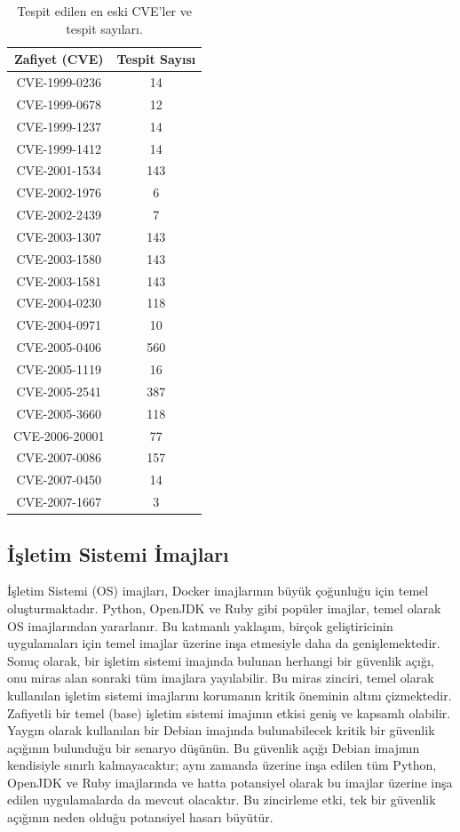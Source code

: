 \begin{table}
    \centering
    \begin{tabular}{ |c|c| }
        \hline
        Zafiyet (CVE) & Tespit Sayısı \\
        \hline
        CVE-1999{-}0236  & 14 \\
        CVE-1999{-}0678  & 12 \\
        CVE-1999{-}1237  & 14 \\
        CVE-1999{-}1412  & 14 \\
        CVE-2001{-}1534  & 143 \\
        CVE-2002{-}1976  & 6 \\
        CVE-2002{-}2439  & 7 \\
        CVE-2003{-}1307  & 143 \\
        CVE-2003{-}1580  & 143 \\
        CVE-2003{-}1581  & 143 \\
        CVE-2004{-}0230  & 118 \\
        CVE-2004{-}0971  & 10 \\
        CVE-2005{-}0406  & 560 \\
        CVE-2005{-}1119  & 16 \\
        CVE-2005{-}2541  & 387 \\
        CVE-2005{-}3660  & 118 \\
        CVE-2006{-}20001 & 77 \\
        CVE-2007{-}0086  & 157 \\
        CVE-2007{-}0450  & 14 \\
        CVE-2007{-}1667  & 3 \\
        \hline
    \end{tabular}
    \caption{Tespit edilen en eski CVE'ler ve tespit sayıları.}\label{tab:oldest-cves-count}
\end{table}

\subsection{İşletim Sistemi İmajları}\label{subsec:os-images}

İşletim Sistemi (OS) imajları, Docker imajlarının büyük çoğunluğu için temel oluşturmaktadır. Python, OpenJDK ve Ruby gibi popüler imajlar, temel olarak OS imajlarından yararlanır. Bu katmanlı yaklaşım, birçok geliştiricinin uygulamaları için temel imajlar üzerine inşa etmesiyle daha da genişlemektedir. Sonuç olarak, bir işletim sistemi imajında bulunan herhangi bir güvenlik açığı, onu miras alan sonraki tüm imajlara yayılabilir. Bu miras zinciri, temel olarak kullanılan işletim sistemi imajlarını korumanın kritik öneminin altını çizmektedir. Zafiyetli bir temel (base) işletim sistemi imajının etkisi geniş ve kapsamlı olabilir. Yaygın olarak kullanılan bir Debian imajında bulunabilecek kritik bir güvenlik açığının bulunduğu bir senaryo düşünün. Bu güvenlik açığı Debian imajının kendisiyle sınırlı kalmayacaktır; aynı zamanda üzerine inşa edilen tüm Python, OpenJDK ve Ruby imajlarında ve hatta potansiyel olarak bu imajlar üzerine inşa edilen uygulamalarda da mevcut olacaktır. Bu zincirleme etki, tek bir güvenlik açığının neden olduğu potansiyel hasarı büyütür.

